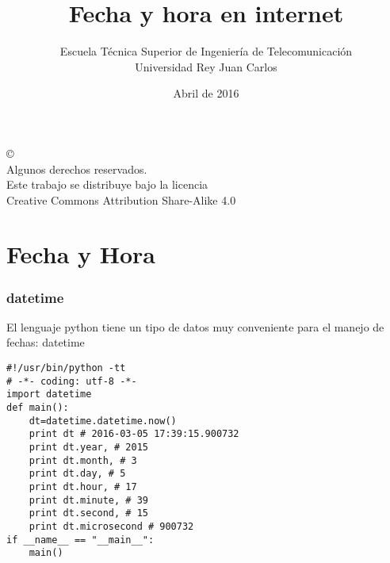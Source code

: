 \documentclass[ucs]{beamer}
\begin{document}
\title[Fecha y hora en internet ]{Fecha y hora en internet}
\author[GSyC]{Escuela Técnica Superior de Ingeniería de Telecomunicación\\
Universidad Rey Juan Carlos}
\date[2016]{Abril de 2016}


\begin{frame}
  \titlepage
\end{frame}



\begin{frame}[b]
\begin{flushright}
{\tiny
\copyright \insertshortdate~\insertshortauthor \\
  Algunos derechos reservados. \\
  Este trabajo se distribuye bajo la licencia \\
  Creative Commons Attribution Share-Alike 4.0\\
}
\end{flushright}  
\end{frame}









\section{Fecha y Hora}
\begin{frame}[fragile]
\frametitle{datetime}

El lenguaje python tiene un tipo de datos muy conveniente para
el manejo de fechas: datetime

  \begin{footnotesize}
  \begin{verbatim}
#!/usr/bin/python -tt
# -*- coding: utf-8 -*-
import datetime
def main():
    dt=datetime.datetime.now()
    print dt # 2016-03-05 17:39:15.900732
    print dt.year, # 2015
    print dt.month, # 3
    print dt.day, # 5
    print dt.hour, # 17
    print dt.minute, # 39
    print dt.second, # 15
    print dt.microsecond # 900732
if __name__ == "__main__":
    main()
  \end{verbatim}
  \end{footnotesize}
\end{frame}
\end{document}
